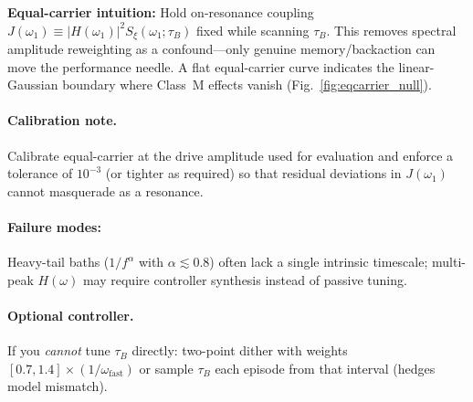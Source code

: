 \documentclass[11pt,letterpaper]{article}
\begin{document}
\begin{tcolorbox}[colback=blue!5!white,colframe=blue!75!black,title=Design Card: Memory-Resonance Condition ($\Theta \approx 1$)]
\textbf{Equal-carrier intuition:} Hold on-resonance coupling $J(\omega_1) \equiv |H(\omega_1)|^2 S_\xi(\omega_1;\tau_B)$ fixed while scanning $\tau_B$. This removes spectral amplitude reweighting as a confound—only genuine memory/backaction can move the performance needle. A flat equal-carrier curve indicates the linear-Gaussian boundary where Class~M effects vanish (Fig.~\ref{fig:eqcarrier_null}).

\paragraph*{Calibration note.} Calibrate equal-carrier at the drive amplitude used for evaluation and enforce a tolerance of $10^{-3}$ (or tighter as required) so that residual deviations in $J(\omega_1)$ cannot masquerade as a resonance.

\paragraph*{Failure modes:}
Heavy-tail baths ($1/f^\alpha$ with $\alpha\!\lesssim\!0.8$) often lack a single intrinsic timescale; multi-peak $H(\omega)$ may require controller synthesis instead of passive tuning.

\paragraph*{Optional controller.}
If you \emph{cannot} tune $\tau_B$ directly: two-point dither with weights $[0.7, 1.4]\times(1/\omega_{\mathrm{fast}})$ or sample $\tau_B$ each episode from that interval (hedges model mismatch).

\end{tcolorbox}
\end{document}
